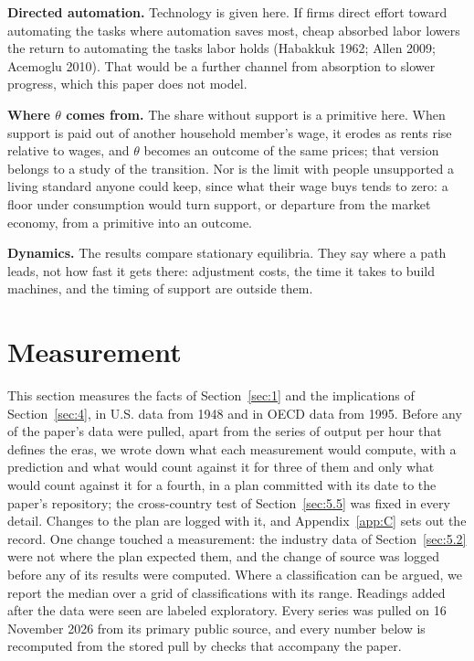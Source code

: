 \documentclass[12pt]{article}
\theoremstyle{plain}
\begin{document}
\textbf{Directed automation.} Technology is given here. If firms direct effort toward automating the tasks where automation saves most, cheap absorbed labor lowers the return to automating the tasks labor holds (Habakkuk 1962; Allen 2009; Acemoglu 2010). That would be a further channel from absorption to slower progress, which this paper does not model.

\textbf{Where $\theta$ comes from.} The share without support is a primitive here. When support is paid out of another household member's wage, it erodes as rents rise relative to wages, and $\theta$ becomes an outcome of the same prices; that version belongs to a study of the transition. Nor is the limit with people unsupported a living standard anyone could keep, since what their wage buys tends to zero: a floor under consumption would turn support, or departure from the market economy, from a primitive into an outcome.

\textbf{Dynamics.} The results compare stationary equilibria. They say where a path leads, not how fast it gets there: adjustment costs, the time it takes to build machines, and the timing of support are outside them.

\section{Measurement}\label{sec:5}

This section measures the facts of Section~\ref{sec:1} and the implications of Section~\ref{sec:4}, in U.S. data from 1948 and in OECD data from 1995. Before any of the paper's data were pulled, apart from the series of output per hour that defines the eras, we wrote down what each measurement would compute, with a prediction and what would count against it for three of them and only what would count against it for a fourth, in a plan committed with its date to the paper's repository; the cross-country test of Section~\ref{sec:5.5} was fixed in every detail. Changes to the plan are logged with it, and Appendix~\ref{app:C} sets out the record. One change touched a measurement: the industry data of Section~\ref{sec:5.2} were not where the plan expected them, and the change of source was logged before any of its results were computed. Where a classification can be argued, we report the median over a grid of classifications with its range. Readings added after the data were seen are labeled exploratory. Every series was pulled on 16 November 2026 from its primary public source, and every number below is recomputed from the stored pull by checks that accompany the paper.
\end{document}
